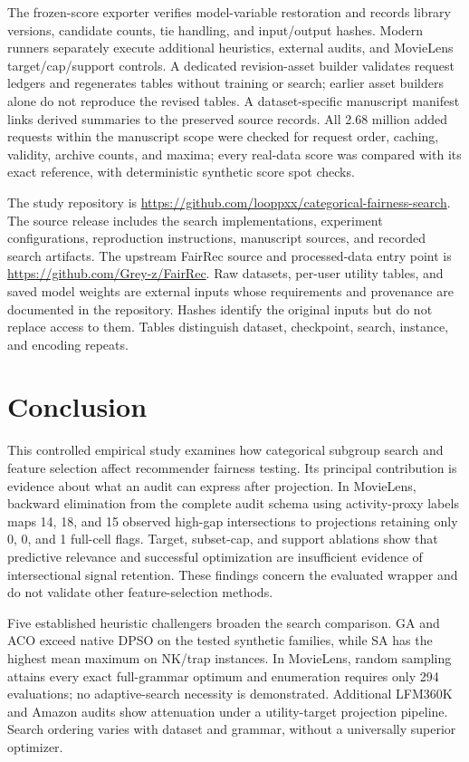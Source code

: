 \documentclass[sigconf,nonacm]{acmart}
\begin{document}
The frozen-score exporter verifies model-variable restoration and records library versions, candidate counts, tie handling, and input/output hashes. Modern runners separately execute additional heuristics, external audits, and MovieLens target/cap/support controls. A dedicated revision-asset builder validates request ledgers and regenerates tables without training or search; earlier asset builders alone do not reproduce the revised tables. A dataset-specific manuscript manifest links derived summaries to the preserved source records. All 2.68 million added requests within the manuscript scope were checked for request order, caching, validity, archive counts, and maxima; every real-data score was compared with its exact reference, with deterministic synthetic score spot checks.

The study repository is \url{https://github.com/looppxx/categorical-fairness-search}. The source release includes the search implementations, experiment configurations, reproduction instructions, manuscript sources, and recorded search artifacts. The upstream FairRec source and processed-data entry point is \url{https://github.com/Grey-z/FairRec}. Raw datasets, per-user utility tables, and saved model weights are external inputs whose requirements and provenance are documented in the repository. Hashes identify the original inputs but do not replace access to them. Tables distinguish dataset, checkpoint, search, instance, and encoding repeats.

\section{Conclusion}
\label{sec:conclusion}

This controlled empirical study examines how categorical subgroup search and feature selection affect recommender fairness testing. Its principal contribution is evidence about what an audit can express after projection. In MovieLens, backward elimination from the complete audit schema using activity-proxy labels maps 14, 18, and 15 observed high-gap intersections to projections retaining only 0, 0, and 1 full-cell flags. Target, subset-cap, and support ablations show that predictive relevance and successful optimization are insufficient evidence of intersectional signal retention. These findings concern the evaluated wrapper and do not validate other feature-selection methods.

Five established heuristic challengers broaden the search comparison. GA and ACO exceed native DPSO on the tested synthetic families, while SA has the highest mean maximum on NK/trap instances. In MovieLens, random sampling attains every exact full-grammar optimum and enumeration requires only 294 evaluations; no adaptive-search necessity is demonstrated. Additional LFM360K and Amazon audits show attenuation under a utility-target projection pipeline. Search ordering varies with dataset and grammar, without a universally superior optimizer.
\end{document}
